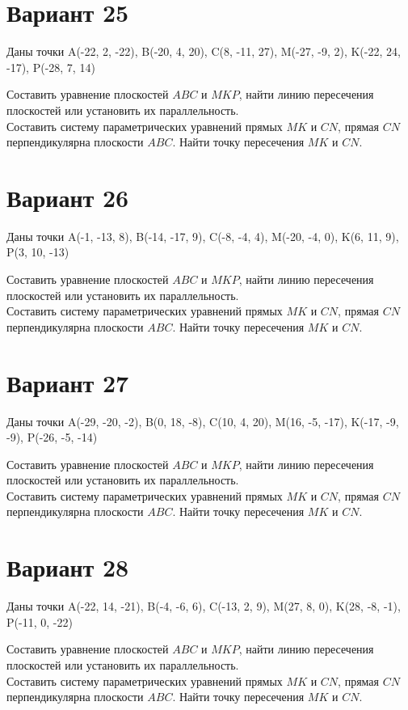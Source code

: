 \documentclass[11pt]{article}
\begin{document}
\section*{Вариант 25}
Даны точки A(-22, 2, -22), B(-20, 4, 20), C(8, -11, 27), M(-27, -9, 2), K(-22, 24, -17), P(-28, 7, 14)

Составить уравнение плоскостей $ABC$ и $MKP$, найти линию пересечения плоскостей или установить их параллельность.\\
Составить систему параметрических уравнений прямых $MK$ и $CN$, прямая $CN$ перпендикулярна плоскости $ABC$. Найти точку пересечения $MK$ и $CN$.

\section*{Вариант 26}
Даны точки A(-1, -13, 8), B(-14, -17, 9), C(-8, -4, 4), M(-20, -4, 0), K(6, 11, 9), P(3, 10, -13)

Составить уравнение плоскостей $ABC$ и $MKP$, найти линию пересечения плоскостей или установить их параллельность.\\
Составить систему параметрических уравнений прямых $MK$ и $CN$, прямая $CN$ перпендикулярна плоскости $ABC$. Найти точку пересечения $MK$ и $CN$.

\section*{Вариант 27}
Даны точки A(-29, -20, -2), B(0, 18, -8), C(10, 4, 20), M(16, -5, -17), K(-17, -9, -9), P(-26, -5, -14)

Составить уравнение плоскостей $ABC$ и $MKP$, найти линию пересечения плоскостей или установить их параллельность.\\
Составить систему параметрических уравнений прямых $MK$ и $CN$, прямая $CN$ перпендикулярна плоскости $ABC$. Найти точку пересечения $MK$ и $CN$.

\section*{Вариант 28}
Даны точки A(-22, 14, -21), B(-4, -6, 6), C(-13, 2, 9), M(27, 8, 0), K(28, -8, -1), P(-11, 0, -22)

Составить уравнение плоскостей $ABC$ и $MKP$, найти линию пересечения плоскостей или установить их параллельность.\\
Составить систему параметрических уравнений прямых $MK$ и $CN$, прямая $CN$ перпендикулярна плоскости $ABC$. Найти точку пересечения $MK$ и $CN$.
\end{document}
